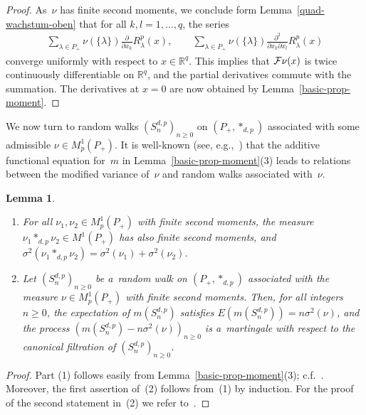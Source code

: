 \documentclass[pdftex]{sigma}
\numberwithin{equation}{section}
\newtheorem{Lemma}[Theorem]{Lemma}
\begin{document}
\begin{proof}
As~$\nu$ has f\/inite second moments, we conclude form Lemma~\ref{quad-wachstum-oben} that for all $k,l=1,\ldots,q$, the
series
\begin{gather*}
\sum\limits_{\lambda\in P_+} \nu( \{\lambda\})
 \frac{\partial}{\partial x_k} R_\lambda^p(x),
\qquad
\sum\limits_{\lambda\in P_+} \nu(\{\lambda\})   \frac{\partial^2}{\partial x_k\partial x_l} R_\lambda^p(x)
\end{gather*}
converge uniformly with respect to $x\in\mathbb R^q$.
This implies that ${\cal F}\nu(x)$ is twice continuously dif\/ferentiable on $\mathbb R^q$, and the partial derivatives
commute with the summation.
The derivatives at $x=0$ are now obtained by Lemma~\ref{basic-prop-moment}.
\end{proof}

We now turn to random walks $(S_n^{d,p})_{n\ge0}$ on $(P_+,*_{d,p})$ associated with some admissible $\nu\in
M^1_p(P_+)$.
It is well-known (see, e.g.,~\cite[Section 7.3]{BH}) that the additive functional equation for~$m$ in
Lemma~\ref{basic-prop-moment}(3) leads to relations between the modif\/ied variance of~$\nu$ and random walks associated
with~$\nu$.

\begin{Lemma}%
\qquad
\begin{enumerate}\itemsep=-1pt
\item[$(1)$]
For all $\nu_1,\nu_2\in M^1_p(P_+)$ with finite second moments, the measure $\nu_1*_{d,p}\nu_2\in
M^1(P_+)$ has also finite second moments, and
$\sigma^2(\nu_1*_{d,p}\nu_2)= \sigma^2(\nu_1)+\sigma^2(\nu_2)$.

\item[$(2)$]
Let $(S_n^{d,p})_{n\ge0}$ be a~random walk on $(P_+,*_{d,p})$ associated with the measure $\nu \in
M^1_p(P_+)$ with finite second moments.
Then, for all integers $n\ge0$, the expectation of $m(S_n^{d,p})$ satisfies $E(m(S_n^{d,p}))=n\sigma^2(\nu)$, and the
process $(m(S_n^{d,p})-n\sigma^2(\nu))_{n\ge0}$
is a~martingale with respect to the canonical filtration of $(S_n^{d,p})_{n\ge0}$.
\end{enumerate}
\end{Lemma}

\begin{proof}
Part (1) follows easily from Lemma~\ref{basic-prop-moment}(3); c.f.~\cite[Section~7.3.7]{BH}.
Moreover, the f\/irst assertion of~(2) follows from~(1) by induction.
For the proof of the second statement in~(2) we refer to~\cite[Proposition 7.3.19]{BH}.
\end{proof}
\end{document}
